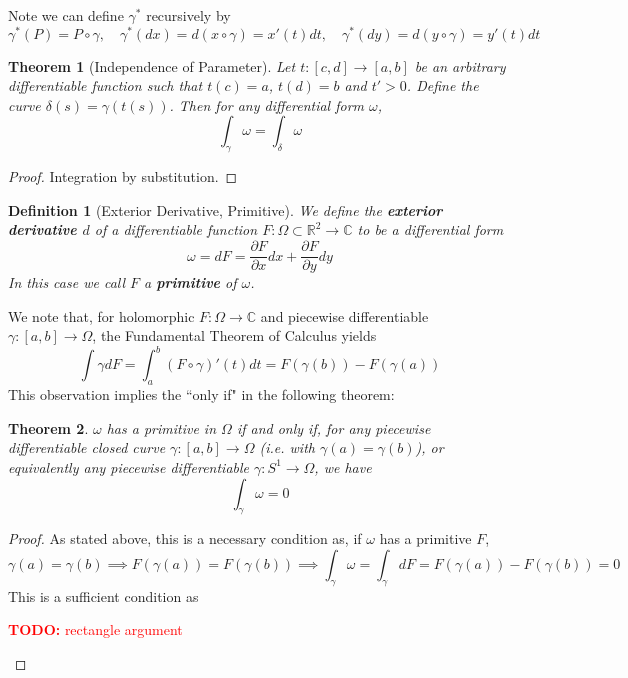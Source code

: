 \documentclass{article}
\newtheorem{theorem}{Theorem}
\newcommand{\mbb}[1]{\mathbb{#1}}
\newcommand{\prt}[2]{{\frac{\partial {#1}}{\partial {#2}}}}
\newcommand{\reals}{\mbb{R}}
\newtheorem{definition}{Definition}
\newcommand{\TODO}[1]{\begin{center}\huge{\textcolor{red}{\textbf{TODO:} #1}}\end{center}}
\begin{document}
Note we can define \(\gamma^*\) recursively by
\begin{equation}
  \gamma^*(P) = P\circ \gamma,
  \quad \gamma^*(dx) = d(x \circ \gamma) = x'(t)dt,
  \quad \gamma^*(dy) = d(y \circ \gamma) = y'(t)dt
\end{equation}

\begin{theorem}[Independence of Parameter]
Let \(t: [c, d] \to [a, b]\) be an arbitrary differentiable function such that \(t(c) = a\), \(t(d) = b\) and \(t' > 0\). Define the curve \(\delta(s) = \gamma(t(s))\). Then for any differential form \(\omega\),
\[\int_\gamma\omega = \int_\delta\omega\]
\end{theorem}
\begin{proof}
Integration by substitution.
\end{proof}

\begin{definition}[Exterior Derivative, Primitive]
We define the \textbf{exterior derivative \(d\)} of a differentiable function \(F: \Omega \subset \reals^2 \to \mbb{C}\) to be a differential form
\begin{equation}
  \omega = dF = \prt{F}{x}dx + \prt{F}{y}dy
\end{equation}
In this case we call \(F\) a \textbf{primitive} of \(\omega\).
\end{definition}

We note that, for holomorphic \(F: \Omega \to \mbb{C}\) and piecewise differentiable \(\gamma: [a, b] \to \Omega\), the Fundamental Theorem of Calculus yields
\begin{equation}
  \int\gamma dF = \int_a^b(F \circ \gamma)'(t)dt = F(\gamma(b)) - F(\gamma(a))
\end{equation}
This observation implies the ``only if" in the following theorem:
\begin{theorem}
\(\omega\) has a primitive in \(\Omega\) if and only if, for any piecewise differentiable closed curve \(\gamma: [a, b] \to \Omega\) (i.e. with \(\gamma(a) = \gamma(b)\)), or equivalently any piecewise differentiable \(\gamma: S^1 \to \Omega\), we have
\begin{equation}
  \int_\gamma\omega = 0
\end{equation}
\end{theorem}
\begin{proof}
As stated above, this is a necessary condition as, if \(\omega\) has a primitive \(F\),
\begin{equation}
  \gamma(a) = \gamma(b) \implies F(\gamma(a)) = F(\gamma(b))
  \implies \int_\gamma\omega = \int_\gamma dF = F(\gamma(a)) - F(\gamma(b)) = 0
\end{equation}
This is a sufficient condition as
\TODO{rectangle argument}
\end{proof}
\end{document}
